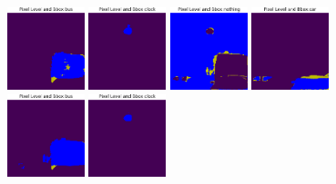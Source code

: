 \begin{figure}[h!tpb]
  \vrule
  \includegraphics[width=0.2\textwidth]{../../modelos-entrenados/unet-nonlocalextra-conv/ejecucion9/predvalmid6}
  \vrule
  \includegraphics[width=0.2\textwidth]{../../modelos-entrenados/unet-nonlocalextra-conv/ejecucion9/predvalmid85}
  \vrule
  \includegraphics[width=0.2\textwidth]{../../modelos-entrenados/unet-semnonlocal-conv/ejecucion11/predvalmid0}
  \vrule
  \includegraphics[width=0.2\textwidth]{../../modelos-entrenados/unet-semnonlocal-conv/ejecucion11/predvalmid3}
  \vrule
  \includegraphics[width=0.2\textwidth]{../../modelos-entrenados/unet-semnonlocal-conv/ejecucion11/predvalmid6}
  \vrule
  \includegraphics[width=0.2\textwidth]{../../modelos-entrenados/unet-semnonlocal-conv/ejecucion11/predvalmid85}

\end{figure}
